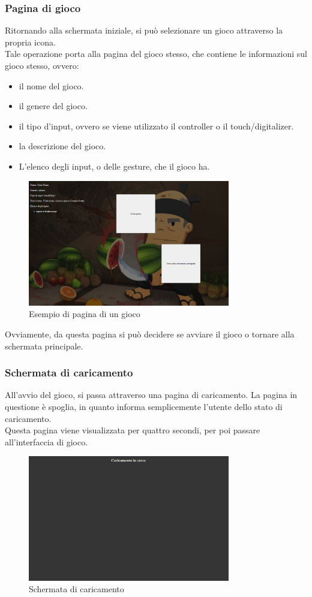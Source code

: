 \subsubsection{Pagina di gioco}
Ritornando alla schermata iniziale, si può selezionare un gioco attraverso la propria icona.\\
Tale operazione porta alla pagina del gioco stesso, che contiene le informazioni sul gioco stesso, ovvero:
\begin{itemize}
    \item il nome del gioco.
    \item il genere del gioco.
    \item il tipo d'input, ovvero se viene utilizzato il controller o il touch/digitalizer.
    \item la descrizione del gioco.
    \item L'elenco degli input, o delle gesture, che il gioco ha.
\end{itemize}
\begin{figure}[h]
    \centering
    \includegraphics[width=250pt]{images/product/schermataPaginaGioco.png}
    \caption{Esempio di pagina di un gioco}
    \label{fig:schermataPaginaGioco}
\end{figure}
Ovviamente, da questa pagina si può decidere se avviare il gioco o tornare alla schermata principale.
\newpage
\subsubsection{Schermata di caricamento}
All'avvio del gioco, si passa attraverso una pagina di caricamento. La pagina in questione è spoglia, in quanto informa semplicemente l'utente dello stato di caricamento.\\
Questa pagina viene visualizzata per quattro secondi, per poi passare all'interfaccia di gioco.
\begin{figure}[h]
    \centering
    \includegraphics[width=250pt]{images/product/schermataCaricamento.png}
    \caption{Schermata di caricamento}
    \label{fig:schermataCaricamento}
\end{figure}

